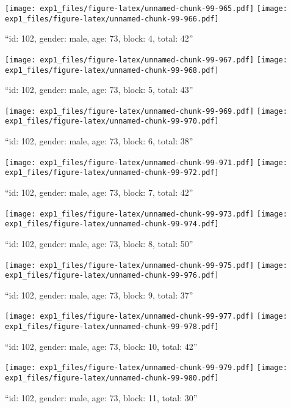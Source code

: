 \documentclass[,]{article}
\begin{document}
\texttt{[image: exp1\_files/figure-latex/unnamed-chunk-99-965.pdf]}
\texttt{[image: exp1\_files/figure-latex/unnamed-chunk-99-966.pdf]}

\newpage
[1] 

``id: 102, gender: male, age: 73, block: 4, total: 42''

\texttt{[image: exp1\_files/figure-latex/unnamed-chunk-99-967.pdf]}
\texttt{[image: exp1\_files/figure-latex/unnamed-chunk-99-968.pdf]}

\newpage
[1] 

``id: 102, gender: male, age: 73, block: 5, total: 43''

\texttt{[image: exp1\_files/figure-latex/unnamed-chunk-99-969.pdf]}
\texttt{[image: exp1\_files/figure-latex/unnamed-chunk-99-970.pdf]}

\newpage
[1] 

``id: 102, gender: male, age: 73, block: 6, total: 38''

\texttt{[image: exp1\_files/figure-latex/unnamed-chunk-99-971.pdf]}
\texttt{[image: exp1\_files/figure-latex/unnamed-chunk-99-972.pdf]}

\newpage
[1] 

``id: 102, gender: male, age: 73, block: 7, total: 42''

\texttt{[image: exp1\_files/figure-latex/unnamed-chunk-99-973.pdf]}
\texttt{[image: exp1\_files/figure-latex/unnamed-chunk-99-974.pdf]}

\newpage
[1] 

``id: 102, gender: male, age: 73, block: 8, total: 50''

\texttt{[image: exp1\_files/figure-latex/unnamed-chunk-99-975.pdf]}
\texttt{[image: exp1\_files/figure-latex/unnamed-chunk-99-976.pdf]}

\newpage
[1] 

``id: 102, gender: male, age: 73, block: 9, total: 37''

\texttt{[image: exp1\_files/figure-latex/unnamed-chunk-99-977.pdf]}
\texttt{[image: exp1\_files/figure-latex/unnamed-chunk-99-978.pdf]}

\newpage
[1] 

``id: 102, gender: male, age: 73, block: 10, total: 42''

\texttt{[image: exp1\_files/figure-latex/unnamed-chunk-99-979.pdf]}
\texttt{[image: exp1\_files/figure-latex/unnamed-chunk-99-980.pdf]}

\newpage
[1] 

``id: 102, gender: male, age: 73, block: 11, total: 30''
\end{document}
